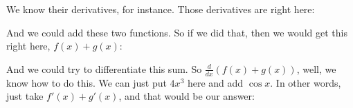 \documentclass[pdftex, brazil, 12pt, twoside]{article}
\begin{document}
We know their derivatives, for instance.
Those derivatives are right here:

\begin{figure}[H]
  \begin{center}
  \end{center}
\end{figure}

And we could add these two functions.
So if we did that, then we would get this right here,
$f(x)+g(x)$:

\begin{figure}[H]
  \begin{center}
  \end{center}
\end{figure}

And we could try to differentiate this sum.
So $\displaystyle \frac{d}{dx} \left(f(x)+g(x)\right)$,
well, we know how to do this.
We can just put $4x^3$ here and add $\cos{x}$.
In other words, just take $f'(x) + g'(x)$,
and that would be our answer:

\begin{figure}[H]
  \begin{center}
  \end{center}
\end{figure}
\end{document}
